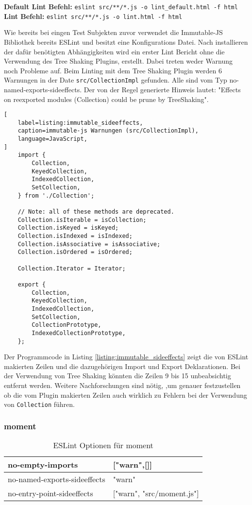 \begin{center}
\textbf{Default Lint Befehl:} \lstinline{eslint src/**/*.js -o lint_default.html -f html}\linebreak 
\textbf{Lint Befehl:} \lstinline{eslint src/**/*.js -o lint.html -f html}
\end{center}

Wie bereits bei eingen Test Subjekten zuvor verwendet die Immutable-JS Bibliothek bereits ESLint und besitzt eine Konfigurations Datei. Nach installieren der dafür benötigten Abhängigkeiten wird ein erster Lint Bericht ohne die Verwendung des Tree Shaking Plugins, erstellt. Dabei treten weder Warnung noch Probleme auf. Beim Linting mit dem Tree Shaking Plugin werden 6 Warnungen in der Date \lstinline{src/CollectionImpl} gefunden. Alle sind vom Typ no-named-exports-sideeffects. Der von der Regel generierte Hinweis lautet: "Effects on reexported modules (Collection) could be prune by TreeShaking".

\begin{lstlisting}[
    label=listing:immutable_sideeffects,
	caption=immutable-js Warnungen (src/CollectionImpl),
	language=JavaScript,
]
	import {
		Collection,
		KeyedCollection,
		IndexedCollection,
		SetCollection,
	} from './Collection';

	// Note: all of these methods are deprecated.
	Collection.isIterable = isCollection;
	Collection.isKeyed = isKeyed;
	Collection.isIndexed = isIndexed;
	Collection.isAssociative = isAssociative;
	Collection.isOrdered = isOrdered;

	Collection.Iterator = Iterator;
	
	export {
  		Collection,
  		KeyedCollection,
  		IndexedCollection,
  		SetCollection,
  		CollectionPrototype,
  		IndexedCollectionPrototype,
	};
\end{lstlisting}

Der Programmcode in Listing \ref{listing:immutable_sideeffects} zeigt die von ESLint makierten Zeilen und die dazugehörigen Import und Export Deklarationen. Bei der Verwendung von Tree Shaking könnten die Zeilen 9 bis 15 unbeabsichtig entfernt werden. Weitere Nachforschungen sind nötig,
 ,um genauer festzustellen ob die vom Plugin makierten Zeilen auch wirklich zu Fehlern bei der Verwendung von \lstinline{Collection} führen. 

\subsubsection{moment}
\begin{table}[H]
\centering
\caption{ESLint Optionen für moment}
\label{tbl:moment-options}
\begin{tabular}{|l|l|}
\hline
no-empty-imports             & {[}"warn",{[}{]}{]}         \\ \hline
no-named-exports-sideeffects & "warn"                      \\ \hline
no-entry-point-sideeffects   & {[}"warn", "src/moment.js"{]} \\ \hline
\end{tabular}
\end{table}

